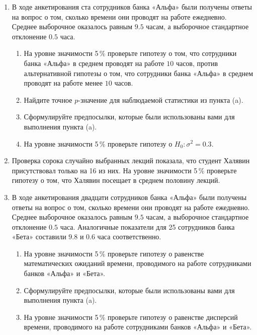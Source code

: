 \begin{enumerate}
\item В ходе анкетирования ста сотрудников банка «Альфа» были получены ответы на
вопрос о том, сколько времени они проводят на работе ежедневно. Среднее выборочное
оказалось равным $9.5$ часам, а выборочное стандартное отклонение $0.5$ часа.
\begin{enumerate}
  \item На уровне значимости 5\,\% проверьте гипотезу о том, что сотрудники банка
	«Альфа» в среднем проводят на работе $10$ часов, против альтернативной гипотезы о
	том, что сотрудники банка «Альфа» в среднем проводят на работе менее $10$ часов.
  \item Найдите точное $p$-значение для наблюдаемой статистики из пункта (a).
  \item Сформулируйте предпосылки, которые были использованы вами для выполнения
	пункта (a).
  \item На уровне значимости 5\,\% проверьте гипотезу о $H_0 \colon \sigma^2 = 0.3$.
\end{enumerate}


\item Проверка сорока случайно выбранных лекций показала, что студент Халявин
присутствовал только на 16 из них. На уровне значимости 5\,\% проверьте гипотезу
о том, что Халявин посещает в среднем половину лекций.

\item В ходе анкетирования двадцати сотрудников банка «Альфа» были получены ответы
на вопрос о том, сколько времени они проводят на работе ежедневно. Среднее выборочное
оказалось равным $9.5$ часам, а выборочное стандартное отклонение $0.5$ часа.
Аналогичные показатели для 25 сотрудников банка «Бета» составили $9.8$ и $0.6$
часа соответственно.
\begin{enumerate}
  \item На уровне значимости 5\,\% проверьте гипотезу о равенстве математических
	ожиданий времени, проводимого на работе сотрудниками банков «Альфа» и «Бета».
  \item Сформулируйте предпосылки, которые были использованы вами для выполнения
	пункта (a).
  \item На уровне значимости 5\,\% проверьте гипотезу о равенстве дисперсий времени,
	проводимого на работе сотрудниками банков «Альфа» и «Бета».
\end{enumerate}


\end{enumerate}
